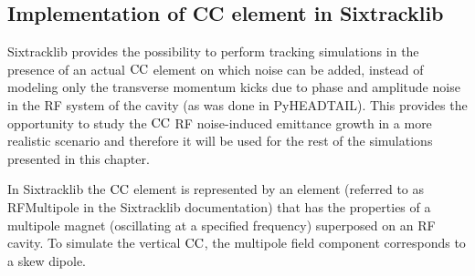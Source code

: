




\subsection{Implementation of CC element in Sixtracklib}\label{subsec:sixtracklig_CC_implementation}
Sixtracklib provides the possibility to perform tracking simulations in the presence of an actual ${\mathrm{CC}}$ element on which noise can be added, instead of modeling only the transverse momentum kicks due to phase and amplitude noise in the RF system of the cavity (as was done in PyHEADTAIL). This provides the opportunity to study the ${\mathrm{CC}}$ RF noise-induced emittance growth in a more realistic scenario and therefore it will be used for the rest of the simulations presented in this chapter.

In Sixtracklib the ${\mathrm{CC}}$ element is represented by an element (referred to as RFMultipole in the Sixtracklib documentation) that has the properties of a multipole magnet (oscillating at a specified frequency) superposed on an RF cavity.  To simulate the vertical ${\mathrm{CC}}$, the multipole field component corresponds to a skew dipole.

